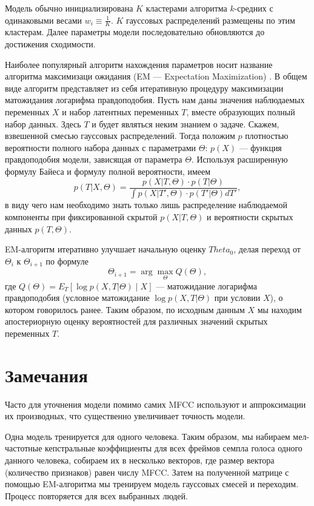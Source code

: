 \documentclass{gost-7-32}
\begin{document}
Модель обычно инициализирована $K$ кластерами алгоритма $k$-средних с одинаковыми весами $w_i \equiv \frac{1}{K}$.
$K$ гауссовых распределений размещены по этим кластерам.
Далее параметры модели последовательно обновляются до достижения сходимости.

Наиболее популярный алгоритм нахождения параметров носит название алгоритма максимизаци ожидания (EM --- Expectation Maximization) \cite{em_new}.
В общем виде алгоритм представляет из себя итеративную процедуру максимизации матожидания логарифма правдоподобия.
Пусть нам даны значения наблюдаемых переменных $X$ и набор латентных переменных $T$, вместе образующих полный набор данных.
Здесь $T$ и будет являться неким знанием о задаче.
Скажем, взвешенной смесью гауссовых распределений.
Тогда положим $p$ плотностью вероятности полного набора данных с параметрами $\Theta$: $p(X)$ --- функция правдоподобия модели, зависящая от параметра $\Theta$.
Используя расширенную формулу Байеса и формулу полной вероятности, имеем
\begin{equation}
    p(T | X, \Theta) = \frac{p(X | T, \Theta) \cdot p(T | \Theta)}{\int p(X | T', \Theta) \cdot p(T' | \Theta) d T'},
\end{equation}
в виду чего нам необходимо знать только лишь распределение наблюдаемой компоненты при фиксированной скрытой $p(X | T, \Theta)$ и вероятности скрытых данных $p(T, \Theta)$.

EM-алгоритм итеративно улучшает начальную оценку $Theta_0$, делая переход от $\Theta_i$ к $\Theta_{i + 1}$ по формуле
\begin{equation}
    \Theta_{i + 1} = \arg \max_\Theta Q(\Theta),
\end{equation}
где $Q(\Theta) = E_T \left[ \log p(X, T | \Theta) \mid X \right]$ --- матожидание логарифма правдоподобия (условное матожидание $\log p(X, T | \Theta)$ при условии $X$), о котором говорилось ранее.
Таким образом, по исходным данным $X$ мы находим апостериорную оценку вероятностей для различных значений скрытых переменных $T$.

\section{Замечания}

Часто для уточнения модели помимо самих MFCC используют и аппроксимации их производных, что существенно увеличивает точность модели.

Одна модель тренируется для одного человека.
Таким образом, мы набираем мел-частотные кепстральные коэффициенты для всех фреймов семпла голоса одного данного человека, собираем их в несколько векторов, где размер вектора (количество признаков) равен числу MFCC.
Затем на полученной матрице с помощью EM-алгоритма мы тренируем модель гауссовых смесей и переходим.
Процесс повторяется для всех выбранных людей.
\end{document}
